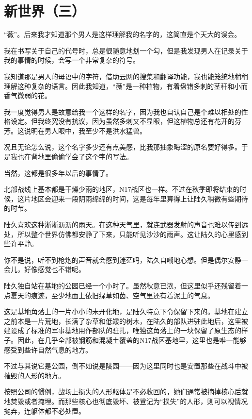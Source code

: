 \chapter{新世界（三）}

\begin{QuoteEnv}[“V”]{}
“薇”。后来我才知道那个男人是这样理解我的名字的，这简直是个天大的误会。

我在书写关于自己的代号时，总是很随意地划一个勾，但是我发现男人在记录关于我的事情的时候，会写一个非常复杂的符号。

我知道那是男人的母语中的字符，借助云网的搜集和翻译功能，我也能笼统地稍稍理解这种复杂的语言。因此我知道，“薇”是一种植物，有着盘错多刺的茎秆和小而香气微弱的花。

我一度觉得男人是故意给我一个这样的名字，因为我也自认自己是个难以相处的性格设定。但我终究没有抗议，因为虽然多刺又不显眼，但这植物总还有花开的芬芳。这说明在男人眼中，我至少不是洪水猛兽。

况且无论怎么说，这个名字多少还有点美感，比我那抽象晦涩的原名要好得多。于是我也在背地里偷偷学会了这个字的写法。

当然，这都是很多年以后的事情了。
\end{QuoteEnv}

北部战线上基本都是干燥少雨的地区，N17战区也一样。不过在秋季即将结束的时候，这片地区会迎来一段阴雨绵绵的时间，这是每年里算得上让陆久稍微有些期待的时节。

陆久喜欢这种淅淅沥沥的雨天。在这种天气里，就连武器发射的声音也难以传到远处，所以整个世界仿佛都安静了下来，只能听见沙沙的雨声。这让陆久的心里感到些许平静。

你不是说，听不到枪炮的声音就会感到迷茫吗，陆久自嘲地心想。但是偶尔安静一会儿，好像感觉也不错呢。

陆久独自站在基地的公园已经一个小时了。虽然秋意已浓，但这里似乎还残留着一点夏天的痕迹，至少地面上依旧绿草如茵、空气里还有着泥土的气息。

这是基地角落上的一片小小的未开化地，是陆久特意下令保留下来的。基地在建立之前本是一片荒地，长满了杂草和低矮的树木，在陆久的部队进驻此地后，这里被建设成了标准的军事基地用作部队的驻扎，唯独这角落上的一块保留了原生态的样子。因此，在几乎全部被钢筋和混凝土覆盖的N17战区基地里，这里也是唯一能够感受到些许自然气息的地方。

不过与其说它是公园，倒不如说是陵园——因为这里同时也是安置那些在战斗中被摧毁的人形的地方。

按照公司的惯例，战场上损失的人形躯体是不必收回的，她们通常被摘掉核心后就地焚毁或者掩埋。而那些核心也彻底毁坏、被登记为“损失”的人形，则可以视情况抛弃，连躯体都不必处置。

